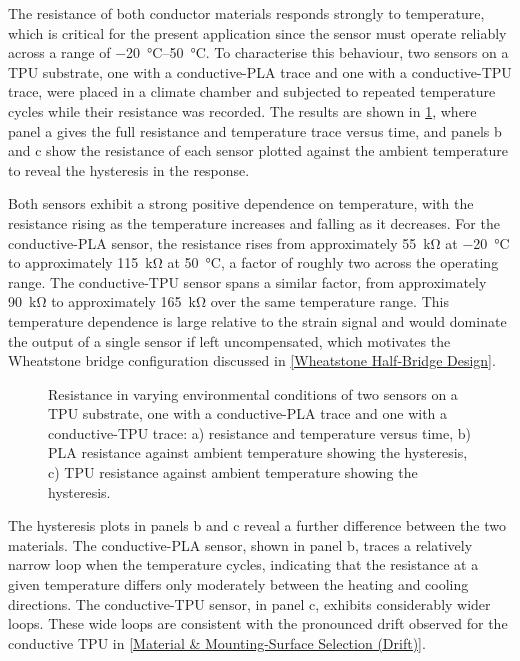 The resistance of both conductor materials responds strongly to temperature, which is critical for the present application since the sensor must operate reliably across a range of \SIrange{-20}{50}{\celsius}. To characterise this behaviour, two sensors on a TPU substrate, one with a conductive-PLA trace and one with a conductive-TPU trace, were placed in a climate chamber and subjected to repeated temperature cycles while their resistance was recorded. The results are shown in \cref{fig:TPUvsPLA_neg_deg}, where panel a gives the full resistance and temperature trace versus time, and panels b and c show the resistance of each sensor plotted against the ambient temperature to reveal the hysteresis in the response.

Both sensors exhibit a strong positive dependence on temperature, with the resistance rising as the temperature increases and falling as it decreases. For the conductive-PLA sensor, the resistance rises from approximately \SI{55}{\kilo\ohm} at \SI{-20}{\celsius} to approximately \SI{115}{\kilo\ohm} at \SI{50}{\celsius}, a factor of roughly two across the operating range. The conductive-TPU sensor spans a similar factor, from approximately \SI{90}{\kilo\ohm} to approximately \SI{165}{\kilo\ohm} over the same temperature range. This temperature dependence is large relative to the strain signal and would dominate the output of a single sensor if left uncompensated, which motivates the Wheatstone bridge configuration discussed in \cref{Wheatstone Half-Bridge Design}.

\begin{figure}[H]
\centering

    \caption{Resistance in varying environmental conditions of two sensors on a TPU substrate, one with a conductive-PLA trace and one with a conductive-TPU trace: a) resistance and temperature versus time, b) PLA resistance against ambient temperature showing the hysteresis, c) TPU resistance against ambient temperature showing the hysteresis.}
    \label{fig:TPUvsPLA_neg_deg}
\end{figure}

The hysteresis plots in panels b and c reveal a further difference between the two materials. The conductive-PLA sensor, shown in panel b, traces a relatively narrow loop when the temperature cycles, indicating that the resistance at a given temperature differs only moderately between the heating and cooling directions. The conductive-TPU sensor, in panel c, exhibits considerably wider loops. These wide loops are consistent with the pronounced drift observed for the conductive TPU in \cref{Material & Mounting-Surface Selection (Drift)}.

